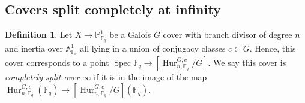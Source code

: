 \documentclass[12 pt]{amsart}
\theoremstyle{plain}
\theoremstyle{definition}
\newtheorem{definition}[theorem]{Definition}
\theoremstyle{remark}
\numberwithin{equation}{section}
\DeclareMathOperator\spec{Spec}
\newcommand{\hur}[4]{[\operatorname{Hur}^{#1, #3}_{#2,#4}/#1]}
\newcommand{\phur}[4]{\operatorname{Hur}^{#1, #3}_{#2,#4}}
\begin{document}
\subsection{Covers split completely at infinity}
\begin{definition}
\label{definition:split-completely}
Let $X \to \mathbb P^1_{\mathbb F_q}$ be a Galois $G$ cover 
with branch divisor of degree $n$ and
inertia over
$\mathbb A^1_{\mathbb F_q}$ all lying in a
union of conjugacy classes $c \subset G$.
Hence, this cover corresponds to a point $\spec \mathbb F_q \to \hur G n c{\mathbb F_q}$.
We say this cover 
is 
{\em completely split over $\infty$} if it is in the image of the map $\phur G n
c {\mathbb F_q} (\mathbb F_q) \to \hur G n c{\mathbb F_q}(\mathbb F_q)$.
\end{definition}
\end{document}
